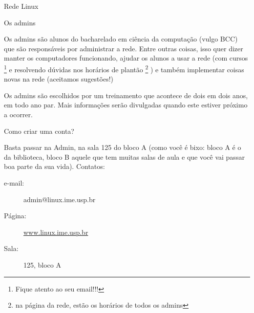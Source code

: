 \begin{subsecao}{Rede Linux}
\begin{subsubsecao}{Os admins}

Os admins são alunos do bacharelado em ciência da computação (vulgo BCC) que
são responsáveis por administrar a rede. Entre outras coisas, isso quer dizer
manter os computadores funcionando, ajudar os alunos a usar a rede (com
cursos \footnote{Fique atento ao seu email!!!} e resolvendo
dúvidas nos horários de plantão \footnote{na página da rede, estão os horários
de todos os admins}
) e também implementar coisas novas na rede (aceitamos sugestões!)

Os admins são escolhidos por um treinamento que acontece de dois em dois anos,
em todo ano par. Mais informações serão divulgadas quando este estiver próximo
a ocorrer.

\end{subsubsecao}
\begin{subsubsecao}{Como criar uma conta?}

Basta passar na Admin, na sala 125 do bloco A (como você é bixo: bloco A é o da
biblioteca, bloco B aquele que tem muitas salas de aula e que você vai passar boa 
parte da sua vida). Contatos:
\begin{description}

\item [e-mail:] admin@linux.ime.usp.br
\item [Página:] \url{www.linux.ime.usp.br}
\item [Sala:] 125, bloco A

\end{description}
\end{subsubsecao}

\end{subsecao}
